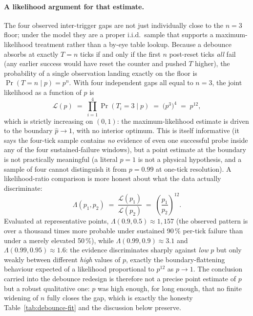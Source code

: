 \paragraph{A likelihood argument for that estimate.} The four observed
inter-trigger gaps are not just individually close to the $n=3$ floor;
under the model they are a proper i.i.d.\ sample that supports a maximum-likelihood
treatment rather than a by-eye table lookup. Because a debounce absorbs at
exactly $T=n$ ticks if and only if the first $n$ post-reset ticks \emph{all}
fail (any earlier success would have reset the counter and pushed $T$
higher), the probability of a single observation landing exactly on the
floor is $\Pr(T{=}n \mid p) = p^{n}$. With four independent gaps all equal to
$n=3$, the joint likelihood as a function of $p$ is
\begin{equation}
\mathcal{L}(p) \;=\; \prod_{i=1}^{4} \Pr(T_i{=}3\mid p) \;=\; \big(p^{3}\big)^{4} \;=\; p^{12},
\end{equation}
which is strictly increasing on $(0,1)$: the maximum-likelihood estimate is
driven to the boundary $\hat p \to 1$, with no interior optimum. This is
itself informative (it says the four-tick sample contains \emph{no}
evidence of even one successful probe inside any of the four
sustained-failure windows), but a point estimate at the boundary is not
practically meaningful (a literal $p=1$ is not a physical hypothesis, and a
sample of four cannot distinguish it from $p=0.99$ at one-tick resolution).
A likelihood-ratio comparison is more honest about what the data actually
discriminate:
\begin{equation}
\Lambda(p_1,p_2) \;=\; \frac{\mathcal{L}(p_1)}{\mathcal{L}(p_2)} \;=\; \left(\frac{p_1}{p_2}\right)^{12}.
\end{equation}
Evaluated at representative points, $\Lambda(0.9,0.5) \approx 1{,}157$ (the
observed pattern is over a thousand times more probable under sustained
90\,\% per-tick failure than under a merely elevated 50\,\%), while
$\Lambda(0.99,0.9) \approx 3.1$ and $\Lambda(0.99,0.95)\approx 1.6$: the
evidence discriminates sharply against \emph{low} $p$ but only weakly
between different \emph{high} values of $p$, exactly the boundary-flattening
behaviour expected of a likelihood proportional to $p^{12}$ as $p\to1$. The
conclusion carried into the debounce redesign is therefore not a precise
point estimate of $p$ but a robust qualitative one: $p$ was high enough,
for long enough, that no finite widening of $n$ fully closes the gap,
which is exactly the honesty Table~\ref{tab:debounce-fit} and the discussion
below preserve.

